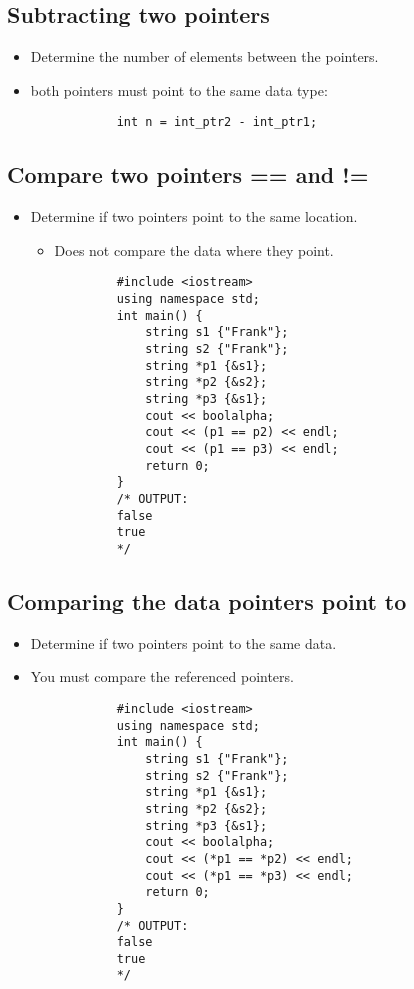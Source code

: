 \subsection{Subtracting two pointers}
\begin{itemize}
    \item Determine the number of elements between the pointers.
    \item both pointers must point to the same data type:
        \begin{verbatim}
            int n = int_ptr2 - int_ptr1;
        \end{verbatim}
\end{itemize}

\subsection{Compare two pointers == and !=}
\begin{itemize}
    \item Determine if two pointers point to the same location.
        \begin{itemize}
            \item Does not compare the data where they point.
        \end{itemize}
        \begin{verbatim}
            #include <iostream>
            using namespace std;
            int main() {
                string s1 {"Frank"};
                string s2 {"Frank"};
                string *p1 {&s1};
                string *p2 {&s2};
                string *p3 {&s1};
                cout << boolalpha;
                cout << (p1 == p2) << endl; 
                cout << (p1 == p3) << endl; 
                return 0;
            }
            /* OUTPUT:
            false
            true
            */
        \end{verbatim}
\end{itemize}

\subsection{Comparing the data pointers point to}
\begin{itemize}
    \item Determine if two pointers point to the same data.
    \item You must compare the referenced pointers.
        \begin{verbatim}
            #include <iostream>
            using namespace std;
            int main() {
                string s1 {"Frank"};
                string s2 {"Frank"};
                string *p1 {&s1};
                string *p2 {&s2};
                string *p3 {&s1};
                cout << boolalpha;
                cout << (*p1 == *p2) << endl; 
                cout << (*p1 == *p3) << endl; 
                return 0;
            }
            /* OUTPUT:
            false
            true
            */
        \end{verbatim}
\end{itemize}

